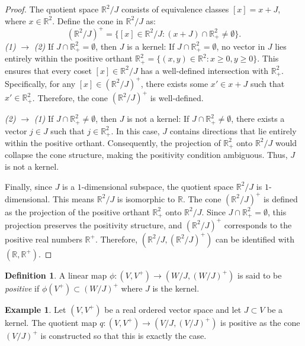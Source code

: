\documentclass[11pt]{amsart}
\theoremstyle{definition}
\newtheorem{defn}[thm]{Definition}
\newtheorem{example}[thm]{Example}
\begin{document}
\begin{proof}
    The quotient space $\mathbb{R}^2 / J$ consists of equivalence classes $[x] = x + J$, where $x \in \mathbb{R}^2$. Define the cone in $\mathbb{R}^2 / J$ as:
    \[
    (\mathbb{R}^2 / J)^+ = \{[x] \in \mathbb{R}^2 / J : (x + J) \cap \mathbb{R}^2_+ \neq \emptyset\}.
    \]
    \textit{(1)} $\rightarrow$ \textit{(2)} If $J \cap \mathbb{R}^2_+ = \emptyset$, then $J$ is a kernel: If $J \cap \mathbb{R}^2_+ = \emptyset$, no vector in $J$ lies entirely within the positive orthant $\mathbb{R}^2_+ = \{(x, y) \in \mathbb{R}^2 : x \geq 0, y \geq 0\}$. This ensures that every coset $[x] \in \mathbb{R}^2 / J$ has a well-defined intersection with $\mathbb{R}^2_+$. Specifically, for any $[x] \in (\mathbb{R}^2 / J)^+$, there exists some $x' \in x + J$ such that $x' \in \mathbb{R}^2_+$. Therefore, the cone $(\mathbb{R}^2 / J)^+$ is well-defined.
    
    \textit{(2)} $\rightarrow$ \textit{(1)} If $J \cap \mathbb{R}^2_+ \neq \emptyset$, then $J$ is not a kernel: If $J \cap \mathbb{R}^2_+ \neq \emptyset$, there exists a vector $j \in J$ such that $j \in \mathbb{R}^2_+$. In this case, $J$ contains directions that lie entirely within the positive orthant. Consequently, the projection of $\mathbb{R}^2_+$ onto $\mathbb{R}^2 / J$ would collapse the cone structure, making the positivity condition ambiguous. Thus, $J$ is not a kernel.

    Finally, since $J$ is a $1$-dimensional subspace, the quotient space $\mathbb{R}^2 / J$ is $1$-dimensional. This means $\mathbb{R}^2 / J$ is isomorphic to $\mathbb{R}$. The cone $(\mathbb{R}^2 / J)^+$ is defined as the projection of the positive orthant $\mathbb{R}^2_+$ onto $\mathbb{R}^2 / J$. Since $J \cap \mathbb{R}^2_+ = \emptyset$, this projection preserves the positivity structure, and $(\mathbb{R}^2 / J)^+$ corresponds to the positive real numbers $\mathbb{R}^+$. Therefore, $(\mathbb{R}^2 / J, (\mathbb{R}^2 / J)^+)$ can be identified with $(\mathbb{R}, \mathbb{R}^+)$.
\end{proof}

\begin{defn}
    A linear map \(\phi: (V, V^+) \to (W/J, (W/J)^+)\) is said to be \emph{positive} if \(\phi(V^+) \subset (W/J)^+\) where \(J\) is the kernel.
\end{defn}

\begin{example}
    Let $(V,V^+)$ be a real ordered vector space and let $J\subset V$ be a kernel. The quotient map $q: (V,V^+)\to (V/J, (V/J)^+)$ is positive as the cone $(V/J)^+$ is constructed so that this is exactly the case.
\end{example}
    
\end{document}
